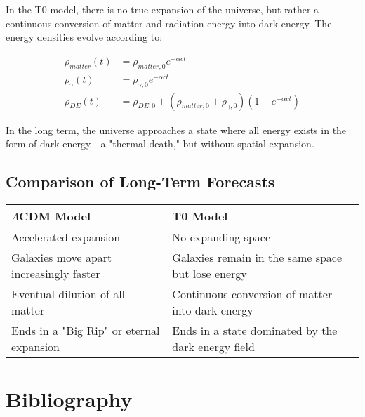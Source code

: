 \documentclass[a4paper,12pt]{article}
\begin{document}
In the T0 model, there is no true expansion of the universe, but rather a continuous conversion of matter and radiation energy into dark energy. The energy densities evolve according to:

\begin{align}
	\rho_{matter}(t) &= \rho_{matter,0} e^{-\alpha c t} \\
	\rho_{\gamma}(t) &= \rho_{\gamma,0} e^{-\alpha c t} \\
	\rho_{DE}(t) &= \rho_{DE,0} + (\rho_{matter,0} + \rho_{\gamma,0})(1 - e^{-\alpha c t})
\end{align}

In the long term, the universe approaches a state where all energy exists in the form of dark energy—a "thermal death," but without spatial expansion.

\subsection{Comparison of Long-Term Forecasts}

\begin{tcolorbox}[colback=yellow!5!white,colframe=yellow!75!black,title=Long-Term Evolution of the Universe]
	\begin{tabular}{|p{}|p{}|}
		\hline
		\textbf{$\Lambda$CDM Model} & \textbf{T0 Model} \\
		\hline
		Accelerated expansion & No expanding space \\
		\hline
		Galaxies move apart increasingly faster & Galaxies remain in the same space but lose energy \\
		\hline
		Eventual dilution of all matter & Continuous conversion of matter into dark energy \\
		\hline
		Ends in a "Big Rip" or eternal expansion & Ends in a state dominated by the dark energy field \\
		\hline
	\end{tabular}
\end{tcolorbox}

\section{Bibliography}
\end{document}

